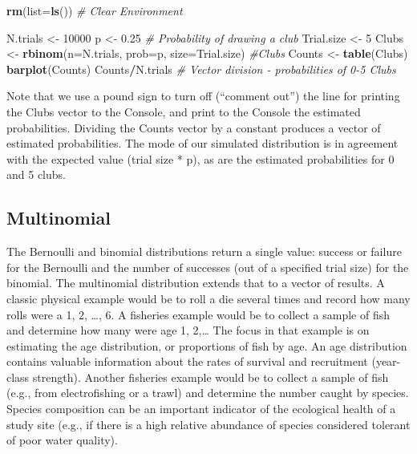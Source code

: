 \documentclass[
]{krantz}
\makeatletter
\newenvironment{Shaded}{\begin{snugshade}}{\end{snugshade}}
\newcommand{\AttributeTok}[1]{\textcolor[rgb]{0.27,0.27,0.27}{#1}}
\newcommand{\CommentTok}[1]{\textcolor[rgb]{0.37,0.37,0.37}{\textit{#1}}}
\newcommand{\DecValTok}[1]{\textcolor[rgb]{0.06,0.06,0.06}{#1}}
\newcommand{\FloatTok}[1]{\textcolor[rgb]{0.06,0.06,0.06}{#1}}
\newcommand{\FunctionTok}[1]{\textcolor[rgb]{0.27,0.27,0.27}{\textbf{#1}}}
\newcommand{\NormalTok}[1]{#1}
\newcommand{\OtherTok}[1]{\textcolor[rgb]{0.37,0.37,0.37}{#1}}
\newcommand{\SpecialCharTok}[1]{\textcolor[rgb]{0.43,0.43,0.43}{\textbf{#1}}}
\newenvironment{kframe}{%
\medskip{}
\setlength{\fboxsep}{.8em}
 \def\at@end@of@kframe{}%
 \ifinner\ifhmode%
  \def\at@end@of@kframe{\end{minipage}}%
  \begin{minipage}{\columnwidth}%
 \fi\fi%
 \def\FrameCommand##1{\hskip\@totalleftmargin \hskip-\fboxsep
 \colorbox{shadecolor}{##1}\hskip-\fboxsep
     \hskip-\linewidth \hskip-\@totalleftmargin \hskip\columnwidth}%
 \MakeFramed {\advance\hsize-\width
   \@totalleftmargin\z@ \linewidth\hsize
   \@setminipage}}%
 {\par\unskip\endMakeFramed%
 \at@end@of@kframe}
\renewenvironment{Shaded}{\begin{kframe}}{\end{kframe}}
\makeatother
\begin{document}
\begin{Shaded}
\begin{Highlighting}[]
\FunctionTok{rm}\NormalTok{(}\AttributeTok{list=}\FunctionTok{ls}\NormalTok{()) }\CommentTok{\# Clear Environment}

\NormalTok{N.trials }\OtherTok{\textless{}{-}} \DecValTok{10000}
\NormalTok{p }\OtherTok{\textless{}{-}} \FloatTok{0.25} \CommentTok{\# Probability of drawing a club}
\NormalTok{Trial.size }\OtherTok{\textless{}{-}} \DecValTok{5}
\NormalTok{Clubs }\OtherTok{\textless{}{-}} \FunctionTok{rbinom}\NormalTok{(}\AttributeTok{n=}\NormalTok{N.trials, }\AttributeTok{prob=}\NormalTok{p, }\AttributeTok{size=}\NormalTok{Trial.size)}
\CommentTok{\#Clubs}
\NormalTok{Counts }\OtherTok{\textless{}{-}} \FunctionTok{table}\NormalTok{(Clubs)}
\FunctionTok{barplot}\NormalTok{(Counts)}
\NormalTok{Counts}\SpecialCharTok{/}\NormalTok{N.trials }\CommentTok{\# Vector division {-} probabilities of 0{-}5 Clubs}
\end{Highlighting}
\end{Shaded}

Note that we use a pound sign to turn off (``comment out'') the line for printing the Clubs vector to the Console, and print to the Console the estimated probabilities. Dividing the Counts vector by a constant produces a vector of estimated probabilities. The mode of our simulated distribution is in agreement with the expected value (trial size * p), as are the estimated probabilities for 0 and 5 clubs.

\hypertarget{Multinomial}{%
\subsection{Multinomial}\label{Multinomial}}

The Bernoulli and binomial distributions return a single value: success or failure for the Bernoulli and the number of successes (out of a specified trial size) for the binomial. The multinomial distribution extends that to a vector of results. A classic physical example would be to roll a die several times and record how many rolls were a 1, 2, \ldots, 6. A fisheries example would be to collect a sample of fish and determine how many were age 1, 2,\ldots{} The focus in that example is on estimating the age distribution, or proportions of fish by age. An age distribution contains valuable information about the rates of survival and recruitment (year-class strength). Another fisheries example would be to collect a sample of fish (e.g., from electrofishing or a trawl) and determine the number caught by species. Species composition can be an important indicator of the ecological health of a study site (e.g., if there is a high relative abundance of species considered tolerant of poor water quality).
\end{document}
